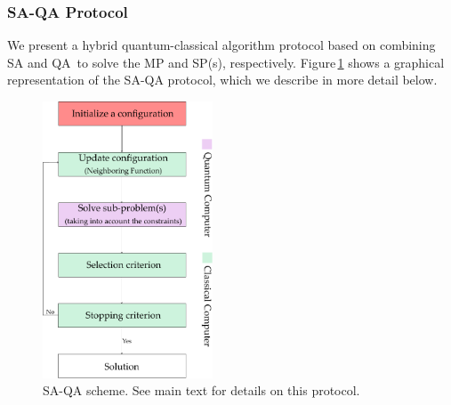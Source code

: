 \subsubsection{SA-QA Protocol}
We present a hybrid quantum-classical algorithm protocol based on combining SA and QA\,\cite{Ding2019ImplementationDesign} to solve the MP and SP(s), respectively. Figure\,\ref{fig:SA_QAProtocol} shows a graphical representation of the SA-QA protocol, which we describe in more detail below. 
\begin{figure}[H]
\centering
\includegraphics[width=0.45\textwidth]{Figures/SAQAProtocol.pdf} 
\caption{SA-QA scheme. See main text for details on this protocol.}
\label{fig:SA_QAProtocol}
\end{figure}
